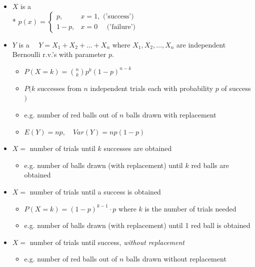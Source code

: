 \documentclass[10pt, landscape]{article}
\begin{document}
\begin{multicols*}{3}
  \begin{itemize}
    \item $X$ is a  
      \\* $p(x) = \begin{cases}
        p, &x=1, \text{ ('success')} \\
        1-p, &x=0\quad  \text{ ('failure')}
      \end{cases}$
    \item $ Y $ is a  $ \quad Y = X_1 + X_2 + \dots + X_n $
      where  $ X_1, X_2, \dots, X_n $ are independent Bernoulli r.v.'s with parameter $ p $.
      \begin{itemize}
        \item $ P(X=k) = \binom{n}{k} p^k (1-p)^{n-k} $
        \item $ P(k $ successes from $ n $ independent trials each with probability $ p $ of success$ ) $
        \item e.g. number of red balls out of $ n $ balls drawn with replacement
        \item $E(Y) = np, \quad Var(Y) = np(1-p)$
      \end{itemize}
    \item {} $ X = $ number of trials until $ k $ successes are obtained
      \begin{itemize}
        \item e.g. number of balls drawn (with replacement) until $ k $ red balls are obtained
      \end{itemize}
    \item {} $ X = $ number of trials until a success is obtained
      \begin{itemize}
        \item $ P(X=k) = (1-p)^{k-1} \cdot p $ where $ k $ is the number of trials needed
        \item e.g. number of balls drawn (with replacement) until 1 red ball is obtained
      \end{itemize}
    \item {} $ X = $ number of trials until success, \textit{without replacement}
      \begin{itemize}
        \item e.g. number of red balls out of $ n $ balls drawn without replacement
      \end{itemize}
  \end{itemize}


\end{multicols*}
\end{document}
